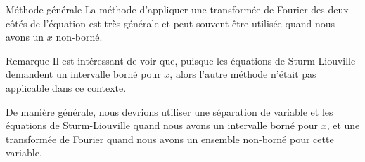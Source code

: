\documentclass[a4paper]{article}
\begin{document}
\begin{parag}{Méthode générale}
    La méthode d'appliquer une transformée de Fourier des deux côtés de l'équation est très générale et peut souvent être utilisée quand nous avons un $x$ non-borné.

    \begin{subparag}{Remarque}
        Il est intéressant de voir que, puisque les équations de Sturm-Liouville demandent un intervalle borné pour $x$, alors l'autre méthode n'était pas applicable dans ce contexte.

        De manière générale, nous devrions utiliser une séparation de variable et les équations de Sturm-Liouville quand nous avons un intervalle borné pour $x$, et une transformée de Fourier quand nous avons un ensemble non-borné pour cette variable.
    \end{subparag}
\end{parag}
\end{document}
